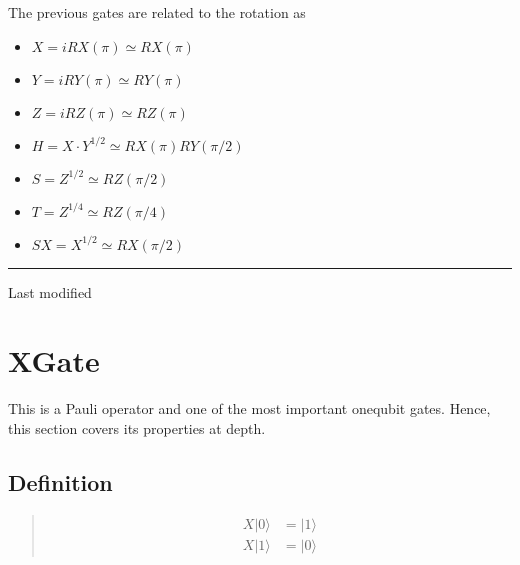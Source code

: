 \documentclass[letterpaper,10pt,english]{jupyterBook}
\begin{document}
\sphinxAtStartPar
The previous gates are related to the rotation as
\begin{itemize}
\item {}
\sphinxAtStartPar
\(X = i RX(\pi) \simeq RX(\pi)\)

\item {}
\sphinxAtStartPar
\(Y = i RY(\pi) \simeq RY(\pi)\)

\item {}
\sphinxAtStartPar
\(Z = i RZ(\pi) \simeq RZ(\pi)\)

\item {}
\sphinxAtStartPar
\(H = X \cdot Y^{1/2} \simeq RX(\pi) RY(\pi/2)\)

\item {}
\sphinxAtStartPar
\(S = Z^{1/2} \simeq RZ(\pi/2)\)

\item {}
\sphinxAtStartPar
\(T = Z^{1/4} \simeq RZ(\pi/4)\)

\item {}
\sphinxAtStartPar
\(SX = X^{1/2} \simeq RX(\pi/2)\)

\end{itemize}


\bigskip\hrule\bigskip


\sphinxAtStartPar
Last modified

\sphinxstepscope


\section{XGate}
\label{\detokenize{q1gates/x:xgate}}\label{\detokenize{q1gates/x:sec-xgate}}\label{\detokenize{q1gates/x::doc}}
\sphinxAtStartPar
This is a Pauli operator and one of the most important one\sphinxhyphen{}qubit gates.  Hence, this section covers its properties at depth.

\sphinxAtStartPar
{}


\subsection{Definition}
\label{\detokenize{q1gates/x:definition}}
\sphinxAtStartPar
{}
\begin{quote}
\begin{align}\label{equation:q1gates/x:XGate}
X |0\rangle &= |1\rangle\\
X |1\rangle &= |0\rangle
\end{align}
\end{quote}
\end{document}
